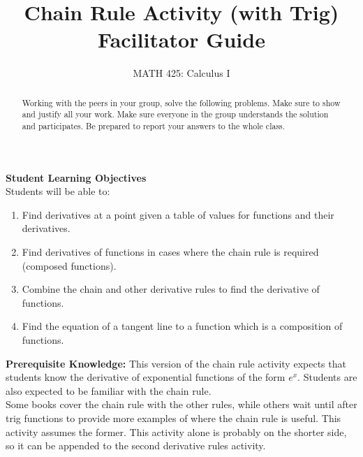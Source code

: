 \documentclass{ximera}
\title{Chain Rule Activity (with Trig) Facilitator Guide}  %
\author{MATH 425: Calculus I}
\begin{document}
\begin{abstract}
    Working with the peers in your group, solve the following problems. Make sure to show and justify all your work. Make sure everyone in the group understands the solution and participates. Be prepared to report your answers to the whole class. 
\end{abstract}
\maketitle

\textbf{Student Learning Objectives}\\
Students will be able to:
    \begin{enumerate}
         \item Find derivatives at a point given a table of values for functions and their derivatives.
        \item Find derivatives of functions in cases where the chain rule is required (composed functions).
        \item Combine the chain and other derivative rules to find the derivative of functions.
        \item Find the equation of a tangent line to a function which is a composition of functions.
    \end{enumerate}
\textbf{Prerequisite Knowledge:} This version of the chain rule activity expects that students know the derivative of exponential functions of the form $e^x$.  Students are also expected to be familiar with the chain rule.  \\

Some books cover the chain rule with the other rules, while others wait until after trig functions to provide more examples of where the chain rule is useful.  This activity assumes the former.  This activity alone is probably on the shorter side, so it can be appended to the second derivative rules activity.  
\end{document}
